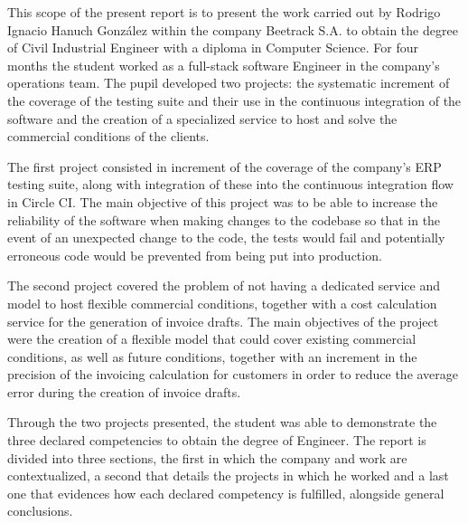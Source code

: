 This scope of the present report is to present the work carried out by Rodrigo Ignacio Hanuch González within the company Beetrack S.A. to obtain  the degree of Civil Industrial Engineer with a diploma in Computer Science. For four months the student worked as a full-stack software Engineer in the company's operations team. The pupil developed two projects: the systematic increment of the coverage of the testing suite and their use in the continuous integration of the software and the creation of a specialized service to host and solve the commercial conditions of the clients.

The first project consisted in increment of the coverage of the company's ERP testing suite, along with integration of these into the continuous integration flow in Circle CI. The main objective of this project was to be able to increase the reliability of the software when making changes to the codebase so that in the event of an unexpected change to the code, the tests would fail and potentially erroneous code would be prevented from being put into production.

The second project covered the problem of not having a dedicated service and model to host flexible commercial conditions, together with a cost calculation service for the generation of invoice drafts. The main objectives of the project were the creation of a flexible model that could cover existing commercial conditions, as well as future conditions, together with an increment in the precision of the invoicing calculation for customers in order to reduce the average error during the creation of invoice drafts.

Through the two projects presented, the student was able to demonstrate the three declared competencies to obtain the degree of Engineer. The report is divided into three sections, the first in which the company and work are contextualized, a second that details the projects in which he worked and a last one that evidences how each declared competency is fulfilled, alongside general conclusions.